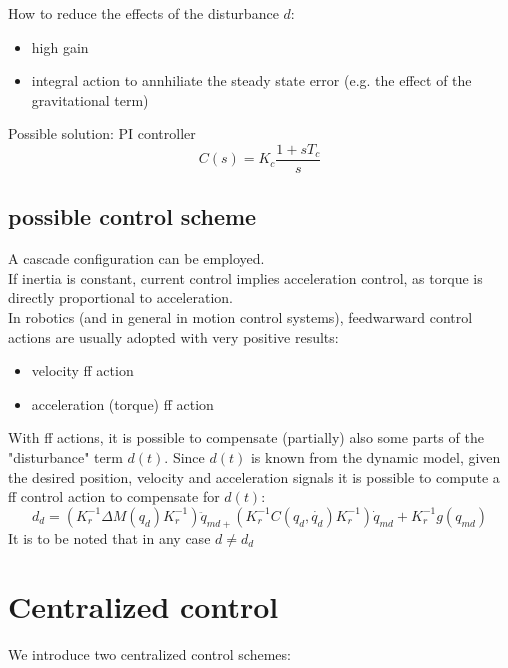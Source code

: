 \documentclass{book}
\begin{document}
How to reduce the effects of the disturbance $d$:
\begin{itemize}
    \item high gain
    \item integral action to annhiliate the steady state error (e.g. the effect of the gravitational term)
\end{itemize}
Possible solution: PI controller
\[
    C(s)=  K_c\frac{1+sT_c}{s}
\]
\subsection{possible control scheme}
A cascade configuration can be employed.\\
If inertia is constant, current control implies acceleration control, as torque is directly proportional to acceleration.\\
In robotics (and in general in motion control systems), feedwarward control actions are usually adopted with very positive results: 
\begin{itemize}
    \item velocity ff action
    \item acceleration (torque) ff action
\end{itemize}
With ff actions, it is possible to compensate (partially) also some parts of the "disturbance" term $d(t)$. Since $d(t)$ is known from the dynamic model, given the desired position, velocity and acceleration signals it is possible to compute a ff control action to compensate for $d(t)$:
\[
    d_d=(K_r^{-1}\Delta M(q_d)K_r^{-1})\ddot{q}_{md+}(K_r^{-1}C(q_d,\dot{q_d})K_r^{-1})\dot{q}_{md}+K_r^{-1}g(q_{md})
\]
It is to be noted that in any case $d\neq d_d$

\section{Centralized control}
We introduce two centralized control schemes:
\end{document}
